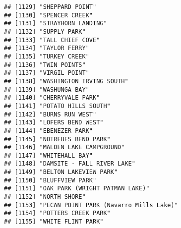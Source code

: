 \documentclass[
]{article}
\begin{document}
\begin{verbatim}
## [1129] "SHEPPARD POINT"                                                                      
## [1130] "SPENCER CREEK"                                                                       
## [1131] "STRAYHORN LANDING"                                                                   
## [1132] "SUPPLY PARK"                                                                         
## [1133] "TALL CHIEF COVE"                                                                     
## [1134] "TAYLOR FERRY"                                                                        
## [1135] "TURKEY CREEK"                                                                        
## [1136] "TWIN POINTS"                                                                         
## [1137] "VIRGIL POINT"                                                                        
## [1138] "WASHINGTON IRVING SOUTH"                                                             
## [1139] "WASHUNGA BAY"                                                                        
## [1140] "CHERRYVALE PARK"                                                                     
## [1141] "POTATO HILLS SOUTH"                                                                  
## [1142] "BURNS RUN WEST"                                                                      
## [1143] "LOFERS BEND WEST"                                                                    
## [1144] "EBENEZER PARK"                                                                       
## [1145] "NOTREBES BEND PARK"                                                                  
## [1146] "MALDEN LAKE CAMPGROUND"                                                              
## [1147] "WHITEHALL BAY"                                                                       
## [1148] "DAMSITE - FALL RIVER LAKE"                                                           
## [1149] "BELTON LAKEVIEW PARK"                                                                
## [1150] "BLUFFVIEW PARK"                                                                      
## [1151] "OAK PARK (WRIGHT PATMAN LAKE)"                                                       
## [1152] "NORTH SHORE"                                                                         
## [1153] "PECAN POINT PARK (Navarro Mills Lake)"                                               
## [1154] "POTTERS CREEK PARK"                                                                  
## [1155] "WHITE FLINT PARK"                                                                    

\end{verbatim}
\end{document}

